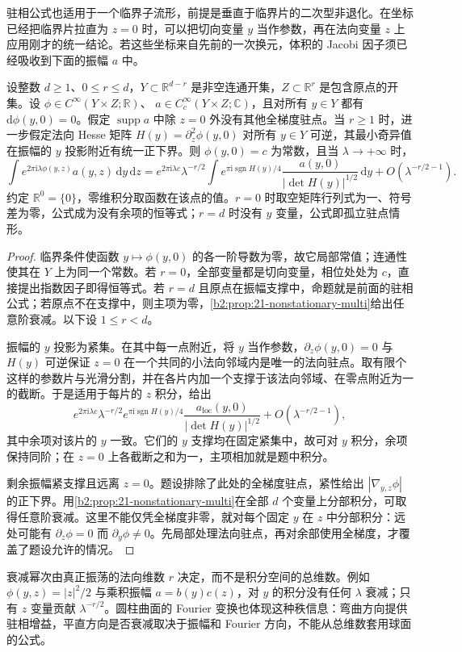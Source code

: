 驻相公式也适用于一个临界子流形，前提是垂直于临界片的二次型非退化。在坐标已经把临界片拉直为 \(z=0\) 时，可以把切向变量 \(y\) 当作参数，再在法向变量 \(z\) 上应用刚才的统一结论。若这些坐标来自先前的一次换元，体积的 Jacobi 因子须已经吸收到下面的振幅 \(a\) 中。

\begin{proposition}[非退化法向临界片]\label{b2:prop:21-clean-stationary}
设整数 \(d\geq1\)、\(0\leq r\leq d\)，\(Y\subset\mathbb R^{d-r}\) 是非空连通开集，\(Z\subset\mathbb R^r\) 是包含原点的开集。设
\(\phi\in C^\infty(Y\times Z;\mathbb R)\)、
\(a\in C_c^\infty(Y\times Z;\mathbb C)\)，且对所有 \(y\in Y\) 都有
\(\mathrm d\phi(y,0)=0\)。假定 \(\operatorname{supp}a\) 中除 \(z=0\) 外没有其他全梯度驻点。当 \(r\geq1\) 时，进一步假定法向 Hesse 矩阵
\(H(y)=\partial_z^2\phi(y,0)\) 对所有 \(y\in Y\) 可逆，其最小奇异值在振幅的 \(y\) 投影附近有统一正下界。则 \(\phi(y,0)=c\) 为常数，且当 \(\lambda\to+\infty\) 时，
\[
 \int e^{2\pi\mathrm i\lambda\phi(y,z)}a(y,z)\,\mathrm dy\,\mathrm dz
 =e^{2\pi\mathrm i\lambda c}\lambda^{-r/2}
 \int e^{\pi\mathrm i\operatorname{sgn}H(y)/4}
 \frac{a(y,0)}{|\det H(y)|^{1/2}}\,\mathrm dy
 +O(\lambda^{-r/2-1}).
\]
约定 \(\mathbb R^0=\{0\}\)，零维积分取函数在该点的值。\(r=0\) 时取空矩阵行列式为一、符号差为零，公式成为没有余项的恒等式；\(r=d\) 时没有 \(y\) 变量，公式即孤立驻点情形。
\end{proposition}
\begin{proof}
临界条件使函数 \(y\mapsto\phi(y,0)\) 的各一阶导数为零，故它局部常值；连通性使其在 \(Y\) 上为同一个常数。若 \(r=0\)，全部变量都是切向变量，相位处处为 \(c\)，直接提出指数因子即得恒等式。若 \(r=d\) 且原点在振幅支撑中，命题就是前面的驻相公式；若原点不在支撑中，则主项为零，\cref{b2:prop:21-nonstationary-multi}给出任意阶衰减。以下设 \(1\leq r<d\)。

振幅的 \(y\) 投影为紧集。在其中每一点附近，将 \(y\) 当作参数，\(\partial_z\phi(y,0)=0\) 与 \(H(y)\) 可逆保证 \(z=0\) 在一个共同的小法向邻域内是唯一的法向驻点。取有限个这样的参数片与光滑分割，并在各片内加一个支撑于该法向邻域、在零点附近为一的截断。于是适用于每片的 \(z\) 积分，给出
\[
 e^{2\pi\mathrm i\lambda c}\lambda^{-r/2}
 e^{\pi\mathrm i\operatorname{sgn}H(y)/4}
 \frac{a_{\mathrm{loc}}(y,0)}{|\det H(y)|^{1/2}}
 +O(\lambda^{-r/2-1}),
\]
其中余项对该片的 \(y\) 一致。它们的 \(y\) 支撑均在固定紧集中，故可对 \(y\) 积分，余项保持同阶；在 \(z=0\) 上各截断之和为一，主项相加就是题中积分。

剩余振幅紧支撑且远离 \(z=0\)。题设排除了此处的全梯度驻点，紧性给出 \(|\nabla_{y,z}\phi|\) 的正下界。用\cref{b2:prop:21-nonstationary-multi}在全部 \(d\) 个变量上分部积分，可取得任意阶衰减。这里不能仅凭全梯度非零，就对每个固定 \(y\) 在 \(z\) 中分部积分：远处可能有 \(\partial_z\phi=0\) 而 \(\partial_y\phi\neq0\)。先局部处理法向驻点，再对余部使用全梯度，才覆盖了题设允许的情况。
\end{proof}
衰减幂次由真正振荡的法向维数 \(r\) 决定，而不是积分空间的总维数。例如 \(\phi(y,z)=|z|^2/2\) 与乘积振幅 \(a=b(y)c(z)\)，对 \(y\) 的积分没有任何 \(\lambda\) 衰减；只有 \(z\) 变量贡献 \(\lambda^{-r/2}\)。圆柱曲面的 Fourier 变换也体现这种秩信息：弯曲方向提供驻相增益，平直方向是否衰减取决于振幅和 Fourier 方向，不能从总维数套用球面的公式。

